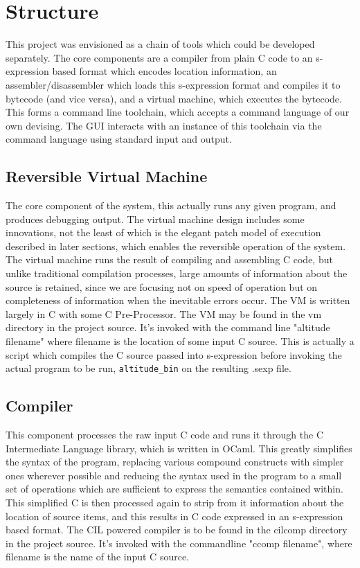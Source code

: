 \documentclass[10pt,a4paper]{report}
\begin{document}
\section{Structure}
This project was envisioned as a chain of tools which could be developed separately. The core components are a compiler from plain C code to an s-expression based format which encodes location information, an assembler/disassembler which loads this s-expression format and compiles it to bytecode (and vice versa), and a virtual machine, which executes the bytecode. This forms a command line toolchain, which accepts a command language of our own devising. The GUI interacts with an instance of this toolchain via the command language using standard input and output.

\subsection{Reversible Virtual Machine}
The core component of the system, this actually runs any given program, and produces debugging output. The virtual machine design includes some innovations, not the least of which is the elegant patch model of execution described in later sections, which enables the reversible operation of the system. The virtual machine runs the result of compiling and assembling C code, but unlike traditional compilation processes, large amounts of information about the source is retained, since we are focusing not on speed of operation but on completeness of information when the inevitable errors occur. The VM is written largely in C with some C Pre-Processor. The VM may be found in the vm directory in the project source. It's invoked with the command line "altitude filename" where filename is the location of some input C source. This is actually a script which compiles the C source passed into s-expression before invoking the actual program to be run, \lstinline{altitude_bin} on the resulting .sexp file.

\subsection{Compiler}
This component processes the raw input C code and runs it through the C Intermediate Language library, which is written in OCaml. This greatly simplifies the syntax of the program, replacing various compound constructs with simpler ones wherever possible and reducing the syntax used in the program to a small set of operations which are sufficient to express the semantics contained within. This simplified C is then processed again to strip from it information about the location of source items, and this results in C code expressed in an s-expression based format. The CIL powered compiler is to be found in the cilcomp directory in the project source. It's invoked with the commandline "ccomp filename", where filename is the name of the input C source.
\end{document}

